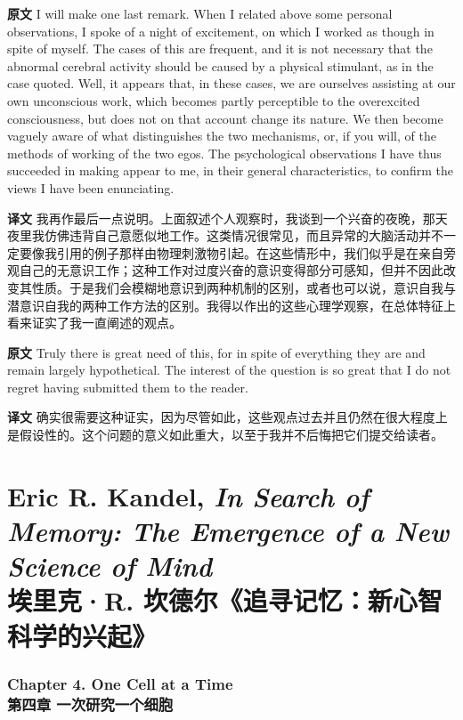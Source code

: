 \documentclass[UTF8,zihao=-4]{ctexart}
\newcommand{\BodyFont}{\fontsize{10.5pt}{15.5pt}\selectfont}
\newcommand{\origlabel}{\textbf{原文}\quad}
\newcommand{\translabel}{\textbf{译文}\quad}
\newenvironment{enblock}{\par\noindent\begingroup\BodyFont\origlabel}{\par\endgroup}
\newenvironment{zhblock}{\par\noindent\begingroup\BodyFont\translabel}{\par\endgroup\vspace{0.35em}}
\begin{document}
\begin{enblock}
I will make one last remark. When I related above some personal observations, I spoke of a night of excitement, on which I worked as though in spite of myself. The cases of this are frequent, and it is not necessary that the abnormal cerebral activity should be caused by a physical stimulant, as in the case quoted. Well, it appears that, in these cases, we are ourselves assisting at our own unconscious work, which becomes partly perceptible to the overexcited consciousness, but does not on that account change its nature. We then become vaguely aware of what distinguishes the two mechanisms, or, if you will, of the methods of working of the two egos. The psychological observations I have thus succeeded in making appear to me, in their general characteristics, to confirm the views I have been enunciating.
\end{enblock}
\begin{zhblock}
我再作最后一点说明。上面叙述个人观察时，我谈到一个兴奋的夜晚，那天夜里我仿佛违背自己意愿似地工作。这类情况很常见，而且异常的大脑活动并不一定要像我引用的例子那样由物理刺激物引起。在这些情形中，我们似乎是在亲自旁观自己的无意识工作；这种工作对过度兴奋的意识变得部分可感知，但并不因此改变其性质。于是我们会模糊地意识到两种机制的区别，或者也可以说，意识自我与潜意识自我的两种工作方法的区别。我得以作出的这些心理学观察，在总体特征上看来证实了我一直阐述的观点。\end{zhblock}

\begin{enblock}
Truly there is great need of this, for in spite of everything they are and remain largely hypothetical. The interest of the question is so great that I do not regret having submitted them to the reader.
\end{enblock}
\begin{zhblock}
确实很需要这种证实，因为尽管如此，这些观点过去并且仍然在很大程度上是假设性的。这个问题的意义如此重大，以至于我并不后悔把它们提交给读者。\end{zhblock}

\part*{Eric R. Kandel, \emph{In Search of Memory: The Emergence of a New Science of Mind}\\埃里克·R. 坎德尔《追寻记忆：新心智科学的兴起》}

\section*{Chapter 4. One Cell at a Time\\第四章 一次研究一个细胞}
\end{document}
